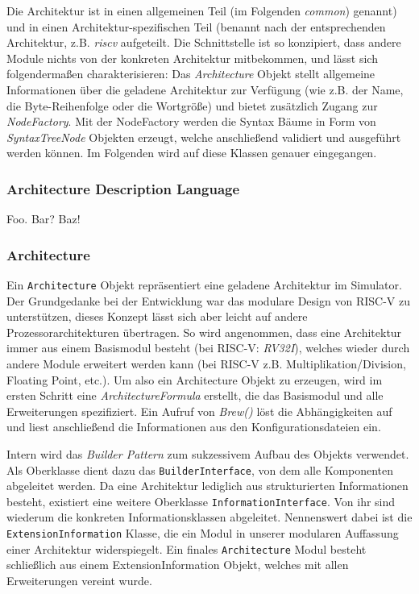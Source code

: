 Die Architektur ist in einen allgemeinen Teil (im Folgenden \emph{common})
genannt) und in einen Architektur-spezifischen Teil (benannt nach der
entsprechenden Architektur, z.B. \emph{riscv} aufgeteilt. Die Schnittstelle ist
so konzipiert, dass andere Module nichts von der konkreten Architektur
mitbekommen, und lässt sich folgendermaßen charakterisieren: Das
\emph{Architecture} Objekt stellt allgemeine Informationen über die geladene
Architektur zur Verfügung (wie z.B. der Name, die Byte-Reihenfolge oder die
Wortgröße) und bietet zusätzlich Zugang zur \emph{NodeFactory}. Mit der
NodeFactory werden die Syntax Bäume in Form von \emph{SyntaxTreeNode} Objekten
erzeugt, welche anschließend validiert und ausgeführt werden können. Im
Folgenden wird auf diese Klassen genauer eingegangen.

\subsubsection{Architecture Description Language}

Foo. Bar? Baz!

\subsubsection{Architecture}

Ein \texttt{Architecture} Objekt repräsentiert eine geladene Architektur im
Simulator. Der Grundgedanke bei der Entwicklung war das modulare Design von
RISC-V zu unterstützen, dieses Konzept lässt sich aber leicht auf andere
Prozessorarchitekturen übertragen. So wird angenommen, dass eine Architektur
immer aus einem Basismodul besteht (bei RISC-V: \emph{RV32I}), welches wieder
durch andere Module erweitert werden kann (bei RISC-V z.B.
Multiplikation/Division, Floating Point, etc.). Um also ein Architecture
Objekt zu erzeugen, wird im ersten Schritt eine \emph{ArchitectureFormula}
erstellt, die das Basismodul und alle Erweiterungen spezifiziert. Ein Aufruf von
\emph{Brew()} löst die Abhängigkeiten auf und liest anschließend die
Informationen aus den Konfigurationsdateien ein.

Intern wird das \emph{Builder Pattern} zum sukzessivem Aufbau des Objekts
verwendet. Als Oberklasse dient dazu das \texttt{BuilderInterface}, von dem alle
Komponenten abgeleitet werden. Da eine Architektur lediglich aus strukturierten
Informationen besteht, existiert eine weitere Oberklasse
\texttt{InformationInterface}. Von ihr sind wiederum die konkreten
Informationsklassen abgeleitet. Nennenswert dabei ist die
\texttt{ExtensionInformation} Klasse, die ein Modul in unserer modularen
Auffassung einer Architektur widerspiegelt. Ein finales \texttt{Architecture}
Modul besteht schließlich aus einem ExtensionInformation Objekt, welches mit
allen Erweiterungen vereint wurde.

